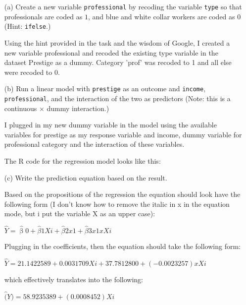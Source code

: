 \documentclass[12pt,letterpaper]{article}
\begin{document}
\newpage
\begin{enumerate}
	
	\item [(a)]
	Create a new variable \texttt{professional} by recoding the variable \texttt{type} so that professionals are coded as $1$, and blue and white collar workers are coded as $0$ (Hint: \texttt{ifelse}.)
	
	Using the hint provided in the task and the wisdom of Google, I created a new variable professional and recoded the existing type variable in the dataset Prestige as a dummy. Category 'prof' was recoded to 1 and all else were recoded to 0.   
	
	
	
	\vspace{1cm}
	
	
	\item [(b)]
	Run a linear model with \texttt{prestige} as an outcome and \texttt{income}, \texttt{professional}, and the interaction of the two as predictors (Note: this is a continuous $\times$ dummy interaction.)
	
	I plugged in my new dummy variable in the model using the available variables for prestige as my response variable and income, dummy variable for professional category and the interaction of these variables. 
	
	The R code for the regression model looks like this:
	
	  
	
	\vspace{1cm}
	\item [(c)]
	Write the prediction equation based on the result.
	
	Based on the propositions of the regression the equation should look have the following form (I don't know how to remove the italic in x in the equation mode, but i put the variable X as an upper case): 
	
	$\hat{Y} = \hat{\upbeta}0 + \hat{\beta}1Xi + \hat{\beta}2x1 + \hat{\beta}3x1xXi$ 
	
	Plugging in the coefficients, then the equation should take the following form:
	
	$\hat{Y} = 21.1422589 + 0.0031709Xi + 37.7812800 + (-0.0023257)xXi$
	
	which effectively translates into the following: 
	
	$\hat(Y) = 58.9235389 + (0.0008452)Xi$ 
	

\end{enumerate}
\end{document}
